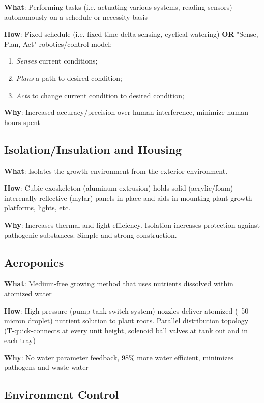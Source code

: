 \documentclass{report}
\begin{document}
\textbf{What}: Performing tasks (i.e. actuating various systems, reading sensors) autonomously on a schedule or necessity basis

\textbf{How}: Fixed schedule (i.e. fixed-time-delta sensing, cyclical watering) \textbf{OR} "Sense, Plan, Act" robotics/control model:
\begin{enumerate}
    \item \textit{Senses} current conditions;
    \item \textit{Plans} a path to desired condition;
    \item \textit{Acts} to change current condition to desired condition;
\end{enumerate}
\textbf{Why}: Increased accuracy/precision over human interference, minimize human hours spent

\subsection{Isolation/Insulation and Housing}
\label{sec:isolationinsulation}

\textbf{What}: Isolates the growth environment from the exterior environment. 

\textbf{How}: Cubic exoskeleton (aluminum extrusion) holds solid (acrylic/foam) interenally-reflective (mylar) panels in place and aids in mounting plant growth platforms, lights, etc.

\textbf{Why}: Increases thermal and light efficiency. Isolation increases protection against pathogenic substances. Simple and strong construction.

\subsection{Aeroponics}
\label{sec:aeroponics}

\textbf{What}: Medium-free growing method that uses nutrients dissolved within atomized water

\textbf{How}: High-pressure (pump-tank-switch system) nozzles deliver atomized (~50 micron droplet) nutrient solution to plant roots. Parallel distribution topology (T-quick-connects at every unit height, solenoid ball valves at tank out and in each tray)

\textbf{Why}: No water parameter feedback, 98\% more water efficient, minimizes pathogens and waste water

\newpage

\subsection{Environment Control}
\label{sec:environment}
\end{document}
